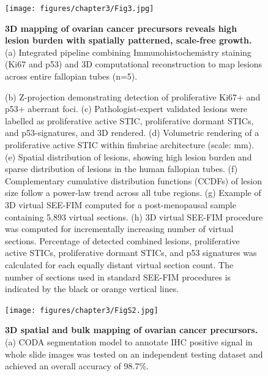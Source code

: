 \begin{refsection}
    \begin{figure}[p]
        \begin{center}
            \texttt{[image: figures/chapter3/Fig3.jpg]}
            \captionsetup{font=small}
            \caption{ \textbf{3D mapping of ovarian cancer precursors reveals high lesion burden with spatially patterned, scale-free growth.} (a) Integrated pipeline combining Immunohistochemistry staining (Ki67 and p53) and 3D computational reconstruction to map lesions across entire fallopian tubes (n=5). }
            \label{chapter3_fig3}
        \end{center}
    \end{figure}
    
    \begin{figure}[h!]
        \ContinuedFloat
        \captionsetup{font=small}
        \caption[]{(b) Z-projection demonstrating detection of proliferative Ki67+ and p53+ aberrant foci. (c) Pathologist-expert validated lesions were labelled as proliferative active STIC, proliferative dormant STICs, and p53-signatures, and 3D rendered. (d) Volumetric rendering of a proliferative active STIC within fimbriae architecture (scale: mm). (e) Spatial distribution of lesions, showing high lesion burden and sparse distribution of lesions in the human fallopian tubes. (f) Complementary cumulative distribution functions (CCDFs) of lesion size follow a power-law trend across all tube regions. (g) Example of 3D virtual SEE-FIM computed for a post-menopausal sample containing 5,893 virtual sections. (h) 3D virtual SEE-FIM procedure was computed for incrementally increasing number of virtual sections. Percentage of detected combined lesions, proliferative active STICs, proliferative dormant STICs, and p53 signatures was calculated for each equally distant virtual section count. The number of sections used in standard SEE-FIM procedures is indicated by the black or orange vertical lines.}
    \end{figure}

    \begin{figure}[p]
        \begin{center}
            \texttt{[image: figures/chapter3/FigS2.jpg]}
            \captionsetup{font=small}
            \caption{ \textbf{3D spatial and bulk mapping of ovarian cancer precursors.} (a) CODA segmentation model to annotate IHC positive signal in whole slide images was tested on an independent testing dataset and achieved an overall accuracy of 98.7\%.}
            \label{chapter3_figS2}
        \end{center}
    \end{figure}
    

\end{refsection}

